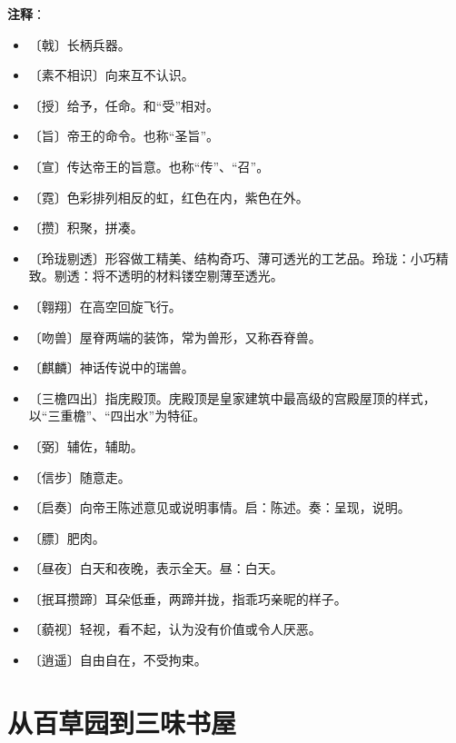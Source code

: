 \documentclass[12pt,UTF-8,openany]{ctexbook}
\begin{document}
\textbf{注释}：

\vspace{-1em}

\begin{itemize}
    \setlength\itemsep{-0.2em}
    \item 〔戟〕长柄兵器。
    \item 〔素不相识〕向来互不认识。
    \item 〔授〕给予，任命。和“受”相对。
    \item 〔旨〕帝王的命令。也称“圣旨”。
    \item 〔宣〕传达帝王的旨意。也称“传”、“召”。
    \item 〔霓〕色彩排列相反的虹，红色在内，紫色在外。
    \item 〔攒〕积聚，拼凑。
    \item 〔玲珑剔透〕形容做工精美、结构奇巧、薄可透光的工艺品。玲珑：小巧精致。剔透：将不透明的材料镂空剔薄至透光。
    \item 〔翱翔〕在高空回旋飞行。
    \item 〔吻兽〕屋脊两端的装饰，常为兽形，又称吞脊兽。
    \item 〔麒麟〕神话传说中的瑞兽。
    \item 〔三檐四出〕指庑殿顶。庑殿顶是皇家建筑中最高级的宫殿屋顶的样式，以“三重檐”、“四出水”为特征。
    \item 〔弼〕辅佐，辅助。
    \item 〔信步〕随意走。
    \item 〔启奏〕向帝王陈述意见或说明事情。启：陈述。奏：呈现，说明。
    \item 〔膘〕肥肉。
    \item 〔昼夜〕白天和夜晚，表示全天。昼：白天。
    \item 〔抿耳攒蹄〕耳朵低垂，两蹄并拢，指乖巧亲昵的样子。
    \item 〔藐视〕轻视，看不起，认为没有价值或令人厌恶。
    \item 〔逍遥〕自由自在，不受拘束。
\end{itemize}

\chapter{从百草园到三味书屋}
\end{document}

